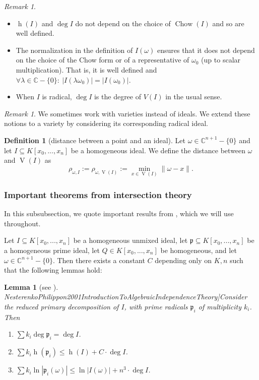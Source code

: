 \documentclass[reqno]{amsart}
\newcommand{\mycite}[2]{\cite[#1]{#2}}
\theoremstyle{plain}
\newtheorem{Lem}[Cor]{Lemma}
\theoremstyle{definition}
\newtheorem{Def}[Cor]{Definition}
\theoremstyle{remark}
\newtheorem{Rem}[Cor]{Remark}
\theoremstyle{plain}
\begin{document}
\begin{Rem}
\leavevmode
\begin{itemize}
    \item $\operatorname{h}(I)$ and $\deg I$ do not depend on the choice of $\operatorname{Chow}(I)$ and so are well defined.
    \item The normalization in the definition of $I(\omega)$ ensures that it does not depend on the choice of the Chow form or of a representative of $\omega_0$ (up to scalar multiplication). That is, it is well defined and $\forall\lambda\in\mathbb C-\{0\}:\ |I(\lambda\omega_0)|=|I(\omega_0)|$.
    \item When $I$ is radical, $\deg I$ is the degree of $V(I)$ in the usual sense.
\end{itemize}
\end{Rem}

\begin{Rem}
We sometimes work with varieties instead of ideals. We extend these notions to a variety by considering its corresponding radical ideal.
\end{Rem}

\begin{Def}[distance between a point and an ideal]
Let $\omega\in\mathbb C^{n+1}-\{0\}$ and let $I\subseteq K[x_0,...,x_n]$ be a homogeneous ideal. We define the distance between $\omega$ and $\operatorname{V}(I)$ as
\[
    \rho_{\omega,I}
        :=
    \rho_{\omega,\operatorname{V}(I)}
        :=
    \min_{x\in\operatorname{V}(I)}\|\omega-x\|
.\]
\end{Def}

\subsubsection{Important theorems from intersection theory}

In this subsubsection, we quote important results from \cite[Chapter 3, \S4, Algebraic fundamentals]{NesterenkoPhilippon2001IntroductionToAlgebraicIndependenceTheory}, which we will use throughout.

Let $I\subseteq K[x_0,...,x_n]$ be a homogeneous unmixed ideal, let $\mathfrak p\subseteq K[x_0,...,x_n]$ be a homogeneous prime ideal, let $Q\in K[x_0,...,x_n]$ be homogeneous, and let $\omega\in\mathbb C^{n+1}-\{0\}$. Then there exists a constant $C$ depending only on $K,n$ such that the following lemmas hold:

\begin{Lem}[see \mycite{Chapter 3, Proposition 4.7}{NesterenkoPhilippon2001IntroductionToAlgebraicIndependenceTheory}]\label{Lemma Nesterenko primary decomposition of ideal}
 Consider the reduced primary decomposition of $I$, with prime radicals $\mathfrak p_i$ of multiplicity $k_i$. Then
\begin{enumerate}
 \item $\sum k_i\deg\mathfrak p_i=\deg I$.
 \item $\sum k_i\operatorname{h}(\mathfrak p_i)\leq\operatorname{h}(I)+C\cdot\deg I$.
 \item $\sum k_i\ln|\mathfrak p_i(\omega)|\leq\ln|I(\omega)|+n^3\cdot\deg I$.
\end{enumerate}
\end{Lem}
\end{document}

